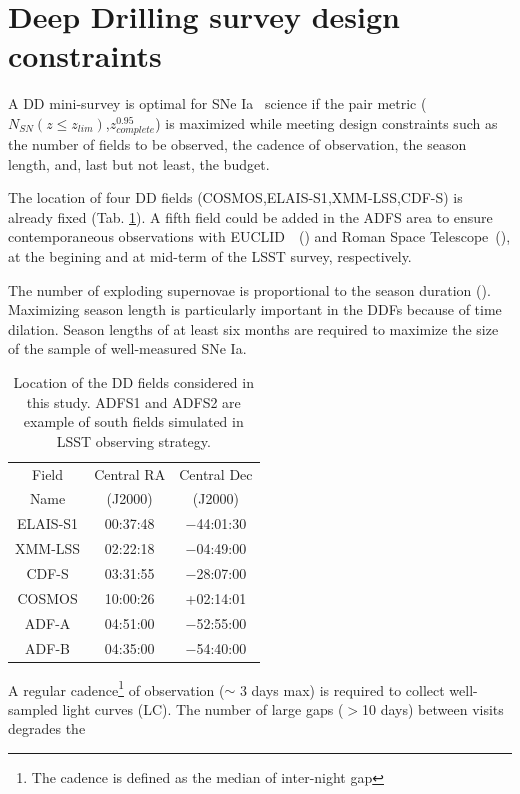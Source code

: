 \documentclass[\docopts]{\docclass}
\newcommand{\cosmos}{{\sc COSMOS}}
\newcommand{\elais}{{\sc ELAIS-S1}}
\newcommand{\xmm}{{\sc XMM-LSS}}
\newcommand{\cdfs}{{\sc CDF-S}}
\newcommand{\adfa}{{\sc ADF-A}}
\newcommand{\adfb}{{\sc ADF-B}}
\newcommand{\euclid}{{\sc EUCLID}}
\newcommand{\romanspace}{{\sc Roman Space Telescope}}
\newcommand{\sne}{{SNe Ia}}
\newcommand{\nsn}{{$N_{SN}(z\leq z_{lim})$}}
\newcommand{\zcompb}{\mbox{$z_{complete}^{0.95}$}}
\begin{document}
\section{Deep Drilling survey design constraints}
\label{sec:design}
A DD mini-survey is optimal for \sne~ science if the pair metric (\nsn,\zcompb) is maximized while meeting design constraints such as the number of fields to be observed, the cadence of observation, the season length, and, last but not least, the budget.
\par
The location of four DD fields (\cosmos,\elais,\xmm,\cdfs) is already fixed (Tab. \ref{tab:locddf}). A fifth field could be added in the ADFS area to ensure contemporaneous observations with \euclid~~(\citealt{laureijs2011euclid,Amendola_2013}) and \romanspace~(\citealt{spergel2015widefield}), at the begining and at mid-term of the LSST survey, respectively.
\par
The number of exploding supernovae is proportional to the season duration (\citealt{perrett}). Maximizing season length is particularly important in the DDFs because of time dilation. Season lengths of at least six months are required to maximize the size of the sample of well-measured \sne.
\begin{table}[!htbp]
  \caption{Location of the DD fields considered in this study. ADFS1 and ADFS2 are example of south fields simulated in LSST observing strategy.}\label{tab:locddf}
  \begin{center}
    \begin{tabular}{c|c|c}
      \hline
      \hline
      Field & Central RA & Central Dec\\ 
      Name & (J2000)  & (J2000)\\
      \hline
     \elais & 00:37:48 & −44:01:30 \\
     \xmm & 02:22:18 &  −04:49:00 \\
     \cdfs & 03:31:55 & −28:07:00 \\
     \cosmos &10:00:26 & +02:14:01 \\
     \hline 
     \adfa & 04:51:00& −52:55:00 \\
     \adfb & 04:35:00 & −54:40:00 \\
      \hline
      \hline
      \end{tabular}
  \end{center}
\end{table}
\par
A regular cadence\footnote{The cadence is defined as the median of inter-night gap} of observation ($\sim$ 3 days max) is required to collect well-sampled light curves (LC). The number of large gaps ($>$10 days) between visits degrades the 
\end{document}
